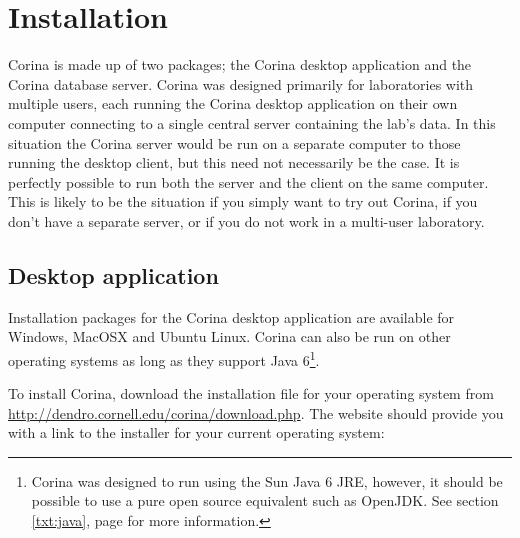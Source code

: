 
\chapter{Installation}

Corina is made up of two packages; the Corina desktop application and the Corina database server.  Corina was designed primarily for laboratories with multiple users, each running the Corina desktop application on their own computer connecting to a single central server containing the lab's data.  In this situation the Corina server would be run on a separate computer to those running the desktop client, but this need not necessarily be the case.  It is perfectly possible to run both the server and the client on the same computer.  This is likely to be the situation if you simply want to try out Corina, if you don't have a separate server, or if you do not work in a multi-user laboratory.


\section{Desktop application}
Installation packages for the Corina desktop application are available for Windows, MacOSX and Ubuntu Linux.  Corina can also be run on other operating systems as long as they support Java 6\footnote{Corina was designed to run using the Sun Java 6 JRE, however, it should be possible to use a pure open source equivalent such as OpenJDK.  See section \ref{txt:java}, page \pageref{txt:java} for more information.}.

To install Corina, download the installation file for your operating system from \url{http://dendro.cornell.edu/corina/download.php}. The website should provide you with a link to the installer for your current operating system:

